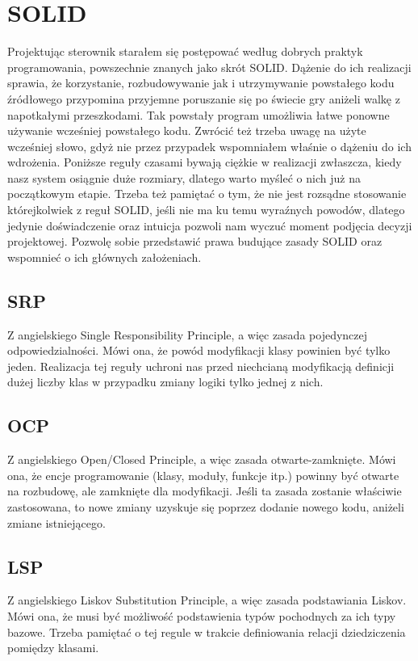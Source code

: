 \chapter{SOLID}
Projektując sterownik starałem się postępować według dobrych praktyk programowania, powszechnie znanych jako skrót SOLID.
Dążenie do ich realizacji sprawia, że korzystanie, rozbudowywanie jak i utrzymywanie powstałego kodu źródłowego przypomina
przyjemne poruszanie się po świecie gry aniżeli walkę z napotkałymi przeszkodami. 
Tak powstały program umożliwia łatwe ponowne używanie wcześniej powstałego kodu. 
Zwrócić też trzeba uwagę na użyte wcześniej słowo, gdyż nie przez przypadek wspomniałem właśnie o dążeniu do ich wdrożenia.
Poniższe reguły czasami bywają ciężkie w realizacji zwłaszcza, kiedy nasz system osiągnie duże rozmiary,
dlatego warto myśleć o nich już na początkowym etapie. 
Trzeba też pamiętać o tym, że nie jest rozsądne stosowanie którejkolwiek z reguł SOLID, jeśli nie ma ku temu wyraźnych powodów, dlatego 
jedynie doświadczenie oraz intuicja pozwoli nam wyczuć moment podjęcia decyzji projektowej.
Pozwolę sobie przedstawić prawa budujące zasady SOLID oraz wspomnieć o ich głównych założeniach.

\section{SRP}
Z angielskiego Single Responsibility Principle, a więc zasada pojedynczej odpowiedzialności.
Mówi ona, że powód modyfikacji klasy powinien być tylko jeden. \autocite[103]{martin2015zwinne}
Realizacja tej reguły uchroni nas przed niechcianą modyfikacją definicji dużej liczby klas w przypadku zmiany logiki tylko jednej z nich.

\section{OCP}
Z angielskiego Open/Closed Principle, a więc zasada otwarte-zamknięte.
Mówi ona, że encje programowanie (klasy, moduły, funkcje itp.) powinny być otwarte na rozbudowę, ale zamknięte dla modyfikacji.\autocite[117]{martin2015zwinne}
Jeśli ta zasada zostanie właściwie zastosowana, to nowe zmiany uzyskuje się poprzez dodanie nowego kodu, aniżeli zmiane istniejącego. 

\section{LSP}
Z angielskiego Liskov Substitution Principle, a więc zasada podstawiania Liskov.
Mówi ona, że musi być możliwość podstawienia typów pochodnych za ich typy bazowe.\autocite[127]{martin2015zwinne}
Trzeba pamiętać o tej regule w trakcie definiowania relacji dziedziczenia pomiędzy klasami.

